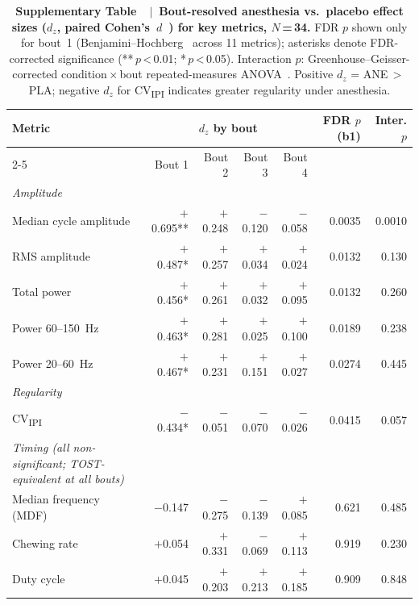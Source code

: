 \label{fig:supp_boutstats}
\begin{table}[!h]
\centering
\caption{\textbf{Supplementary Table~\thesuppfigure~$|$~Bout-resolved
anesthesia vs.\ placebo effect sizes ($d_z$, paired Cohen's~$d$~\cite{Cohen1988})
for key metrics, $N$\,=\,34.}
FDR $p$ shown only for bout~1 (Benjamini--Hochberg~\cite{Benjamini1995} across
11 metrics); asterisks denote FDR-corrected significance (**\,$p$\,<\,0.01;
*\,$p$\,<\,0.05).
Interaction $p$: Greenhouse--Geisser-corrected condition\,$\times$\,bout
repeated-measures ANOVA~\cite{Pingouin}.
Positive $d_z$ = ANE\,$>$\,PLA; negative $d_z$ for CV\textsubscript{IPI}
indicates greater regularity under anesthesia.}
\label{tab:bout_stats}
\begin{tabular}{lrrrrrr}
\toprule
Metric & \multicolumn{4}{c}{$d_z$ by bout} & FDR $p$ (b1) & Inter. $p$ \\
\cmidrule(lr){2-5}
       & Bout 1 & Bout 2 & Bout 3 & Bout 4 & & \\
\midrule
\textit{Amplitude}\\
\quad Median cycle amplitude & $+$0.695** & $+$0.248 & $-$0.120 & $-$0.058 & 0.0035 & 0.0010 \\
\quad RMS amplitude          & $+$0.487*  & $+$0.257 & $+$0.034 & $+$0.024 & 0.0132 & 0.130  \\
\quad Total power            & $+$0.456*  & $+$0.261 & $+$0.032 & $+$0.095 & 0.0132 & 0.260  \\
\quad Power 60--150~Hz       & $+$0.463*  & $+$0.281 & $+$0.025 & $+$0.100 & 0.0189 & 0.238  \\
\quad Power 20--60~Hz        & $+$0.467*  & $+$0.231 & $+$0.151 & $+$0.027 & 0.0274 & 0.445  \\
\midrule
\textit{Regularity}\\
\quad CV\textsubscript{IPI}  & $-$0.434*  & $-$0.051 & $-$0.070 & $-$0.026 & 0.0415 & 0.057  \\
\midrule
\textit{Timing (all non-significant; TOST-equivalent at all bouts)}\\
\quad Median frequency (MDF) & $-$0.147 & $-$0.275 & $-$0.139 & $+$0.085 & 0.621 & 0.485 \\
\quad Chewing rate           & $+$0.054 & $+$0.331 & $-$0.069 & $+$0.113 & 0.919 & 0.230 \\
\quad Duty cycle             & $+$0.045 & $+$0.203 & $+$0.213 & $+$0.185 & 0.909 & 0.848 \\
\bottomrule
\end{tabular}
\end{table}

